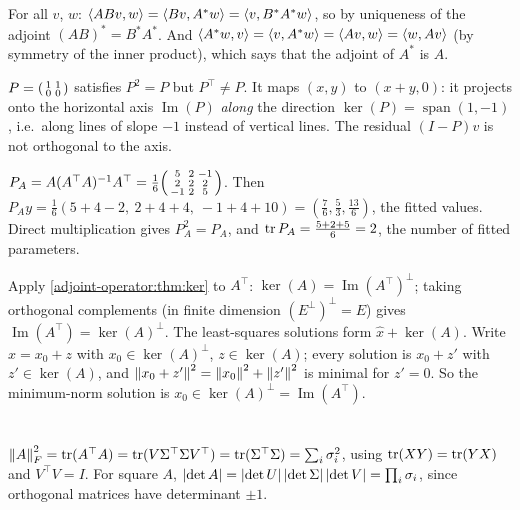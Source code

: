 For all $v$, $w$: $\left\langle ABv, w \right\rangle = \left\langle Bv, A^*w \right\rangle = \left\langle v, B^*A^*w \right\rangle$, so by uniqueness of the adjoint
$(AB)^* = B^*A^*$. And $\left\langle A^*w, v \right\rangle = \left\langle v, A^*w \right\rangle = \left\langle Av, w \right\rangle = \left\langle w, Av \right\rangle$ (by symmetry of the inner
product), which says that the adjoint of $A^*$ is $A$.

$P = \begin{psmallmatrix}1&1\\0&0\end{psmallmatrix}$ satisfies $P^2 = P$ but $P^\top\neq P$. It maps $(x,y)$ to $(x+y, 0)$: it projects
onto the horizontal axis $\operatorname{Im}(P)$ \emph{along} the direction $\ker(P) = \operatorname{span}(1,-1)$, i.e.\ along
lines of slope $-1$ instead of vertical lines. The residual $(I-P)v$ is not orthogonal to the axis.

$P_A = A(A^\top A)^{-1}A^\top = \frac16\begin{psmallmatrix}5&2&-1\\2&2&2\\-1&2&5\end{psmallmatrix}$. Then
$P_Ay = \frac16(5+4-2,\ 2+4+4,\ -1+4+10) = (\frac76,\frac53,\frac{13}6)$, the fitted values. Direct multiplication gives
$P_A^2 = P_A$, and $\operatorname{tr} P_A = \frac{5+2+5}6 = 2$, the number of fitted parameters.

Apply \cref{adjoint-operator:thm:ker} to $A^\top$: $\ker(A) = \operatorname{Im}(A^\top)^\perp$; taking orthogonal complements
(in finite dimension $(E^\perp)^\perp = E$) gives $\operatorname{Im}(A^\top) = \ker(A)^\perp$. The least-squares solutions form
$\hat x + \ker(A)$. Write $\hat x = x_0 + z$ with $x_0\in\ker(A)^\perp$, $z\in\ker(A)$; every solution is $x_0 + z'$ with
$z'\in\ker(A)$, and $\left\|x_0 + z'\right\|^2 = \left\|x_0\right\|^2 + \left\|z'\right\|^2$ is minimal for $z' = 0$. So the minimum-norm solution
is $x_0\in\ker(A)^\perp = \operatorname{Im}(A^\top)$.

\section{}

$\left\|A\right\|_F^2 = \operatorname{tr}(A^\top A) = \operatorname{tr}(V\Sigma^\top\Sigma V^\top) = \operatorname{tr}(\Sigma^\top\Sigma) = \sum_i\sigma_i^2$, using $\operatorname{tr}(XY) = \operatorname{tr}(YX)$ and
$V^\top V = I$. For square $A$, $\left|\det A\right| = \left|\det U\right|\left|\det\Sigma\right|\left|\det V\right| = \prod_i\sigma_i$, since orthogonal
matrices have determinant $\pm1$.

